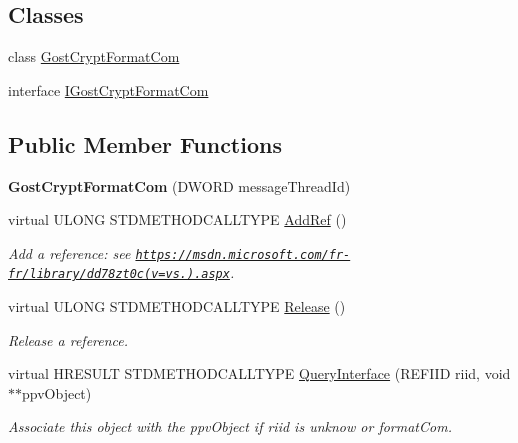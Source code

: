 \subsection*{Classes}
\begin{DoxyCompactItemize}
\item 
class \hyperlink{class_gost_crypt_format_com_1_1_gost_crypt_format_com}{Gost\+Crypt\+Format\+Com}
\item 
interface \hyperlink{interface_gost_crypt_format_com_1_1_i_gost_crypt_format_com}{I\+Gost\+Crypt\+Format\+Com}
\end{DoxyCompactItemize}
\subsection*{Public Member Functions}
\begin{DoxyCompactItemize}
\item 
\mbox{\label{class_gost_crypt_format_com_aa535ba1b406867149c84ce107c71837f}} 
{\bfseries Gost\+Crypt\+Format\+Com} (D\+W\+O\+RD message\+Thread\+Id)
\item 
virtual U\+L\+O\+NG S\+T\+D\+M\+E\+T\+H\+O\+D\+C\+A\+L\+L\+T\+Y\+PE \hyperlink{class_gost_crypt_format_com_aa8ab201fd5ec791ed5d0e619cc268cef}{Add\+Ref} ()
\begin{DoxyCompactList}\small\item\em Add a reference\+: see \href{https://msdn.microsoft.com/fr-fr/library/dd78zt0c(v=vs.110).aspx}{\tt https\+://msdn.\+microsoft.\+com/fr-\/fr/library/dd78zt0c(v=vs.).\+aspx}. \end{DoxyCompactList}\item 
virtual U\+L\+O\+NG S\+T\+D\+M\+E\+T\+H\+O\+D\+C\+A\+L\+L\+T\+Y\+PE \hyperlink{class_gost_crypt_format_com_a8664a77c7bd4507f88109e4358465218}{Release} ()
\begin{DoxyCompactList}\small\item\em Release a reference. \end{DoxyCompactList}\item 
virtual H\+R\+E\+S\+U\+LT S\+T\+D\+M\+E\+T\+H\+O\+D\+C\+A\+L\+L\+T\+Y\+PE \hyperlink{class_gost_crypt_format_com_a91c2843633f10496031609c27e248347}{Query\+Interface} (R\+E\+F\+I\+ID riid, void $\ast$$\ast$ppv\+Object)
\begin{DoxyCompactList}\small\item\em Associate this object with the ppv\+Object if riid is unknow or format\+Com. \end{DoxyCompactList}\item 
$$
\end{DoxyCompactItemize}
